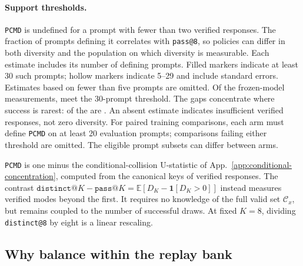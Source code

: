 \documentclass{article}
\newcommand{\1}{\mathbf 1}
\newcommand{\E}{\mathbb E}
\newcommand{\pmd}{\texttt{PCMD}}
\theoremstyle{remark}
\theoremstyle{definition}
\theoremstyle{plain}
\begin{document}
\paragraph{Support thresholds.}
\pmd{} is undefined for a prompt with fewer than two verified responses.
The fraction of prompts defining it correlates \MDdefinedcorr{} with
\texttt{pass@8}, so policies can differ in both diversity and the population
on which diversity is measurable. Each estimate includes its number of
defining prompts. Filled markers indicate at least 30 such prompts; hollow
markers indicate 5--29 and include standard errors. Estimates based on fewer
than five prompts are omitted. Of the \MDcells{} frozen-model measurements,
\MDreportable{} meet the 30-prompt threshold. The gaps concentrate where
success is rarest: \MDtopgapcount{} of the \MDgaps{} are \MDtopgapdomain{}.
An absent estimate indicates insufficient verified responses, not zero diversity.
For paired training comparisons, each arm must define \pmd{} on at least 20
evaluation prompts; comparisons failing either threshold are omitted. The
eligible prompt subsets can differ between arms.

\pmd{} is one minus the conditional-collision U-statistic of
App.~\ref{app:conditional-concentration}, computed from the canonical keys
of verified responses. The contrast
$\texttt{distinct@}K-\texttt{pass@}K=\E[D_K-\1[D_K>0]]$ instead measures
verified modes beyond the first. It requires no knowledge of the full valid
set $\mathcal C_x$, but remains coupled to the number of successful draws.
At fixed $K=8$, dividing \texttt{distinct@8} by eight is a linear rescaling.

\subsection{Why balance within the replay bank}
\label{app:replay-metric-alignment}
\end{document}
